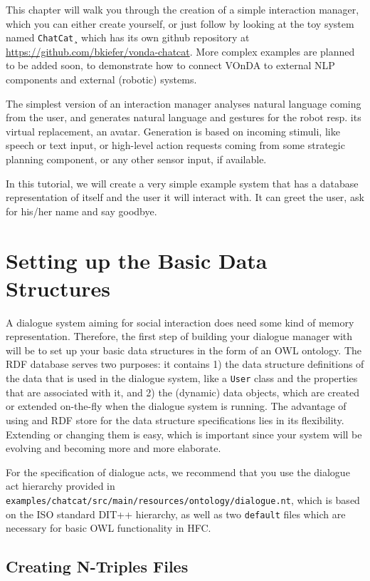 This chapter will walk you through the creation of a simple
interaction manager, which you can either create yourself, or just
follow by looking at the toy system named \texttt{ChatCat}¸ which has
its own github repository at
\url{https://github.com/bkiefer/vonda-chatcat}.  More complex examples
are planned to be added soon, to demonstrate how to connect VOnDA to
external NLP components and external (robotic) systems.

The simplest version of an interaction manager analyses natural language
coming from the user, and generates natural language and gestures for the robot
resp. its virtual replacement, an avatar. Generation is based on incoming
stimuli, like speech or text input, or high-level action requests coming from
some strategic planning component, or any other sensor input, if available.

In this tutorial, we will create a very simple example system that has a
database representation of itself and the user it will interact with. It can
greet the user, ask for his/her name and say goodbye.

\section{Setting up the Basic Data Structures}
\label{sec:example-hfc}

A dialogue system aiming for social interaction does need some kind of memory
representation. Therefore, the first step of building your dialogue manager
with \vonda will be to set up your basic data structures in the form of an OWL
ontology. The RDF database serves two purposes: it contains 1) the data
structure definitions of the data that is used in the dialogue system, like a
\texttt{User} class and the properties that are associated with it, and 2) the
(dynamic) data objects, which are created or extended on-the-fly when the
dialogue system is running. The advantage of using and RDF store for the data
structure specifications lies in its flexibility. Extending or changing them is
easy, which is important since your system will be evolving and becoming more
and more elaborate.

For the specification of dialogue acts, we recommend that you use the dialogue
act hierarchy provided in
\texttt{examples/chatcat/src/main/resources/ontology/dialogue.nt}, which is
based on the ISO standard DIT++ hierarchy, as well as two \texttt{default}
files which are necessary for basic OWL functionality in HFC.

\subsection{Creating N-Triples Files}


